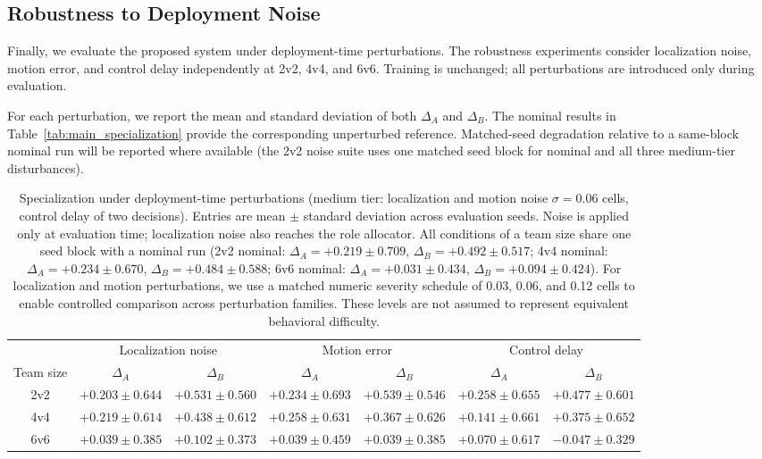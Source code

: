 \subsection{Robustness to Deployment Noise}

Finally, we evaluate the proposed system under deployment-time perturbations.
The robustness experiments consider localization noise, motion error, and
control delay independently at 2v2, 4v4, and 6v6. Training is unchanged; all
perturbations are introduced only during evaluation.

For each perturbation, we report the mean and standard deviation of both
\(\Delta_A\) and \(\Delta_B\). The nominal results in
Table~\ref{tab:main_specialization} provide the corresponding unperturbed
reference. Matched-seed degradation relative to a same-block nominal run will
be reported where available (the 2v2 noise suite uses one matched seed block
for nominal and all three medium-tier disturbances).

\begin{table}[t]
\centering
\caption{Specialization under deployment-time perturbations (medium tier:
localization and motion noise $\sigma = 0.06$ cells, control delay of two
decisions). Entries are mean $\pm$ standard deviation across evaluation seeds.
Noise is applied only at evaluation time; localization noise also reaches the
role allocator. All conditions of a team size share one seed block with a
nominal run (2v2 nominal: $\Delta_A = +0.219 \pm 0.709$,
$\Delta_B = +0.492 \pm 0.517$; 4v4 nominal: $\Delta_A = +0.234 \pm 0.670$,
$\Delta_B = +0.484 \pm 0.588$; 6v6 nominal: $\Delta_A = +0.031 \pm 0.434$,
$\Delta_B = +0.094 \pm 0.424$). For localization and motion perturbations, we
use a matched numeric severity schedule of 0.03, 0.06, and 0.12 cells to enable
controlled comparison across perturbation families. These levels are not
assumed to represent equivalent behavioral difficulty.}
\label{tab:noise_results}
\begin{tabular}{c|cc|cc|cc}
\hline
& \multicolumn{2}{c|}{Localization noise}
& \multicolumn{2}{c|}{Motion error}
& \multicolumn{2}{c}{Control delay} \\
Team size
& $\Delta_A$ & $\Delta_B$
& $\Delta_A$ & $\Delta_B$
& $\Delta_A$ & $\Delta_B$ \\
\hline
2v2
& $+0.203 \pm 0.644$ & $+0.531 \pm 0.560$
& $+0.234 \pm 0.693$ & $+0.539 \pm 0.546$
& $+0.258 \pm 0.655$ & $+0.477 \pm 0.601$ \\ %

4v4
& $+0.219 \pm 0.614$ & $+0.438 \pm 0.612$
& $+0.258 \pm 0.631$ & $+0.367 \pm 0.626$
& $+0.141 \pm 0.661$ & $+0.375 \pm 0.652$ \\ %

6v6
& $+0.039 \pm 0.385$ & $+0.102 \pm 0.373$
& $+0.039 \pm 0.459$ & $+0.039 \pm 0.385$
& $+0.070 \pm 0.617$ & $-0.047 \pm 0.329$ \\ %
\hline
\end{tabular}
\end{table}

